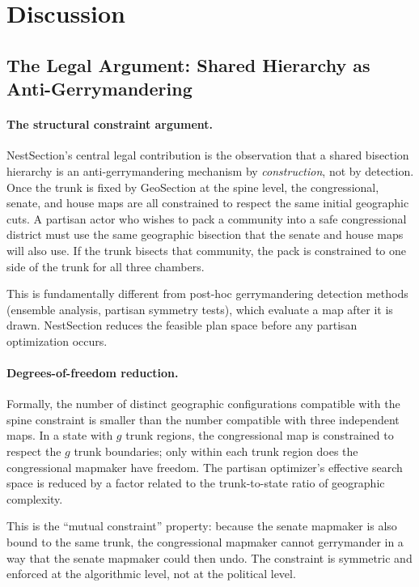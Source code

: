 \section{Discussion}
\label{sec:discussion}

\subsection{The Legal Argument: Shared Hierarchy as Anti-Gerrymandering}

\paragraph{The structural constraint argument.}
NestSection's central legal contribution is the observation that a shared
bisection hierarchy is an anti-gerrymandering mechanism by \emph{construction},
not by detection.  Once the trunk is fixed by GeoSection at the spine level,
the congressional, senate, and house maps are all constrained to respect the
same initial geographic cuts.  A partisan actor who wishes to pack a community
into a safe congressional district must use the same geographic bisection that
the senate and house maps will also use.  If the trunk bisects that community,
the pack is constrained to one side of the trunk for all three chambers.

This is fundamentally different from post-hoc gerrymandering detection methods
(ensemble analysis, partisan symmetry tests), which evaluate a map after it is
drawn.  NestSection reduces the feasible plan space before any partisan
optimization occurs.

\paragraph{Degrees-of-freedom reduction.}
Formally, the number of distinct geographic configurations compatible with the
spine constraint is smaller than the number compatible with three independent
maps.  In a state with $g$ trunk regions, the congressional map is constrained
to respect the $g$ trunk boundaries; only within each trunk region does the
congressional mapmaker have freedom.  The partisan optimizer's effective search
space is reduced by a factor related to the trunk-to-state ratio of geographic
complexity.

This is the ``mutual constraint'' property: because the senate mapmaker is also
bound to the same trunk, the congressional mapmaker cannot gerrymander in a way
that the senate mapmaker could then undo.  The constraint is symmetric and
enforced at the algorithmic level, not at the political level.


